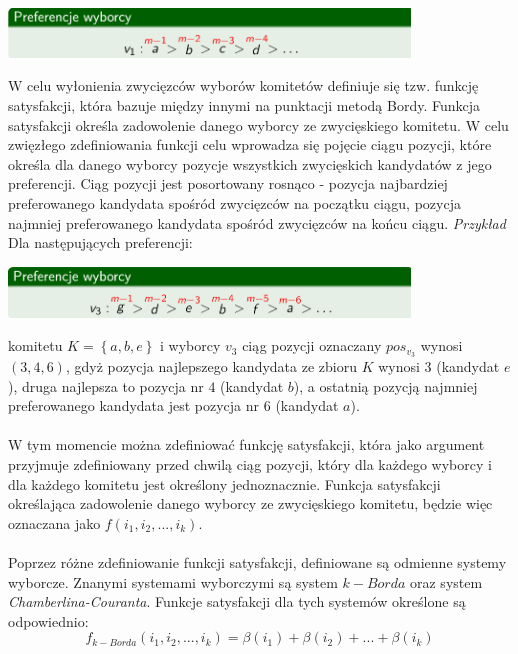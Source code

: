 \documentclass[polish,11pt]{aghthesis}
\begin{document}
\begin{center}
\includegraphics[width=0.8\textwidth]{pics/Borda_points.png}
\end{center}
W celu wyłonienia zwycięzców wyborów komitetów definiuje się tzw. funkcję satysfakcji,
która bazuje między innymi na punktacji metodą Bordy. Funkcja satysfakcji określa
zadowolenie danego wyborcy ze zwycięskiego komitetu. W celu zwięzłego zdefiniowania
funkcji celu wprowadza się pojęcie ciągu pozycji, które określa dla danego wyborcy pozycje
wszystkich zwycięskich kandydatów z jego preferencji. Ciąg pozycji jest posortowany
rosnąco - pozycja najbardziej preferowanego kandydata spośród zwycięzców na początku
ciągu, pozycja najmniej preferowanego kandydata spośród zwycięzców na końcu ciągu.
\clearpage
\noindent
\emph{Przykład} \\ 
Dla następujących preferencji:
\begin{center}
\includegraphics[width=0.8\textwidth]{pics/positions.png}
\end{center}
komitetu $K = \left\{a, b, e\right\}$ i wyborcy $v_3$ ciąg pozycji oznaczany $pos_{v_3}$ wynosi $(3,4,6)$, gdyż pozycja najlepszego kandydata ze zbioru $K$ wynosi $3$ (kandydat $e$), druga najlepsza to pozycja nr $4$ (kandydat $b$), a ostatnią pozycją najmniej preferowanego kandydata jest pozycja nr $6$ (kandydat $a$). \\ \\
W tym momencie można zdefiniować funkcję satysfakcji, która jako argument przyjmuje
zdefiniowany przed chwilą ciąg pozycji, który dla każdego wyborcy i dla każdego komitetu
jest określony jednoznacznie. Funkcja satysfakcji określająca zadowolenie danego wyborcy
ze zwycięskiego komitetu, będzie więc oznaczana jako $f(i_1, i_2, ... , i_k)$. \\ \\
Poprzez różne zdefiniowanie funkcji satysfakcji, definiowane są odmienne systemy
wyborcze. Znanymi systemami wyborczymi są system $k-Borda$ oraz system
\textit{Chamberlina-Couranta}. Funkcje satysfakcji dla tych systemów określone są odpowiednio:
\begin{equation}
\label{eq:k_borda}
f_{k-Borda}(i_1, i_2, ..., i_k) = \beta(i_1) + \beta(i_2) + ... + \beta(i_k) 
\end{equation}
\end{document}
